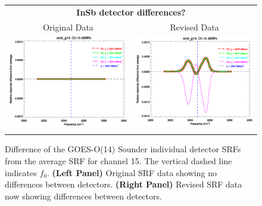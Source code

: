 \begin{figure}[htp]
  \centering
  \begin{tabular}{c c}
    \multicolumn{2}{c}{\textsf{\bfseries InSb detector differences?}} \\
    \hspace{1.5em}\textsf{Original Data} &
    \hspace{1.5em}\textsf{Revised Data} \\
    \includegraphics[scale=0.5,trim=0 40 0 0]{graphics/dsrf_anomaly/original/sndr_g14.ch15.srf.eps} &
    \includegraphics[scale=0.5,trim=0 40 0 0]{graphics/dsrf_anomaly/revised/sndr_g14.ch15.srf.eps} \\\\
  \end{tabular}
  \caption{Difference of the GOES-O(14) Sounder individual detector SRFs from the average SRF for channel 15. The vertical dashed line indicates $f_0$. \textbf{(Left Panel)} Original SRF data showing no differences between detectors. \textbf{(Right Panel)} Revised SRF data now showing differences between detectors.}
  \label{fig:sndr_g14.ch15.dsrf_anomaly}
\end{figure}

